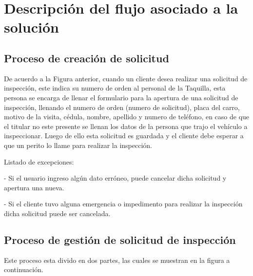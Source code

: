 \setlength{\parskip}{0mm}


\section{Descripción del flujo asociado a la solución} 
\setlength{\parskip}{5mm}
\setlength{\parskip}{0mm}

\subsection{Proceso de creación de solicitud}
\setlength{\parskip}{5mm}


De acuerdo a la Figura anterior, cuando un cliente desea realizar una solicitud de inspección, este indica su numero de orden al personal de la Taquilla, esta persona se encarga de llenar el formulario para la apertura de una solicitud de inspección, llenando el numero de orden (numero de solicitud), placa del carro, motivo de la visita, cédula, nombre, apellido y numero de teléfono, en caso de que el titular no este presente se llenan los datos de la persona que trajo el vehículo a inspeccionar. Luego de ello esta solicitud es guardada y el cliente debe esperar a que un perito lo llame para realizar la inspección.

Listado de excepciones:

- Si el usuario ingreso algún dato erróneo, puede cancelar dicha solicitud y apertura una nueva.

- Si el cliente tuvo alguna emergencia o impedimento para realizar la inspección dicha solicitud puede ser cancelada.

\setlength{\parskip}{0mm}

\subsection{Proceso de gestión de solicitud de inspección}
\setlength{\parskip}{5mm}

Este proceso esta divido en dos partes, las cuales se muestran en la figura a continuación.


